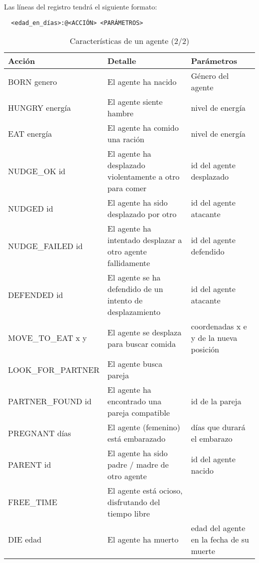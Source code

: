 Las líneas del registro tendrá el siguiente formato:
\begin{verbatim}
  <edad_en_días>:@<ACCIÓN> <PARÁMETROS>
\end{verbatim}

\begin{table}[h]
\centering %
\begin{tabular}{| p{4cm} | p{5cm} | p{4cm} |} %
\hline\hline
Acción & Detalle & Parámetros \\
\hline %

    BORN genero & El agente ha nacido & Género del agente \\
    HUNGRY energía & El agente siente hambre & nivel de energía \\
    EAT energía & El agente ha comido una ración & nivel de energía \\
    NUDGE\_OK id & El agente ha desplazado violentamente a otro para comer &
id del agente desplazado\\
    NUDGED id & El agente ha sido desplazado por otro & id del agente
atacante \\
    NUDGE\_FAILED id & El agente ha intentado desplazar a otro agente
fallidamente & id del agente defendido \\
    DEFENDED id & El agente se ha defendido de un intento de desplazamiento &
id del agente atacante\\
    MOVE\_TO\_EAT x y & El agente se desplaza para buscar comida &
coordenadas x e y de la nueva posición \\
    LOOK\_FOR\_PARTNER & El agente busca pareja & \\
    PARTNER\_FOUND id & El agente ha encontrado una pareja compatible & id de
la pareja \\
    PREGNANT días & El agente (femenino) está embarazado & días que durará el
embarazo \\
    PARENT id & El agente ha sido padre / madre de otro agente & id del
agente nacido \\
    FREE\_TIME & El agente está ocioso, disfrutando del tiempo libre & \\
    DIE edad & El agente ha muerto & edad del agente en la fecha de su muerte \\


\hline %
\end{tabular}
\label{tab:caracteristicas}
\caption{Características de un agente (2/2)} %
\end{table}


